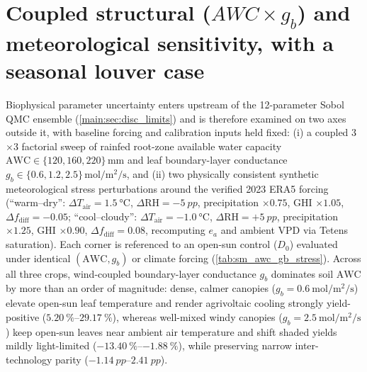 \documentclass[preprint,12pt,a4paper]{elsarticle}
\begin{document}
\section{Coupled structural ($AWC\times g_b$) and meteorological sensitivity, with a seasonal louver case}
\label{sec:sm_structural_louver}

Biophysical parameter uncertainty enters upstream of the \num{12}-parameter Sobol QMC ensemble (\cref{main:sec:disc_limits}) and is therefore examined on two axes outside it, with baseline forcing and calibration inputs held fixed: (i) a coupled \num{3}$\times$\num{3} factorial sweep of rainfed root-zone available water capacity $\mathrm{AWC}\in\{\num{120}, \num{160}, \num{220}\}\,\unit{\milli\meter}$ and leaf boundary-layer conductance $g_b\in\{\num{0.6}, \num{1.2}, \num{2.5}\}\,\unit{\mole\per\square\meter\per\second}$, and (ii) two physically consistent synthetic meteorological stress perturbations around the verified 2023 ERA5 forcing (``warm--dry'': $\Delta T_{\mathrm{air}}=\qty{+1.5}{\celsius}$, $\Delta\mathrm{RH}=-\qty{5}{pp}$, precipitation $\times\num{0.75}$, GHI $\times\num{1.05}$, $\Delta f_{\mathrm{diff}}=\num{-0.05}$; ``cool--cloudy'': $\Delta T_{\mathrm{air}}=\qty{-1.0}{\celsius}$, $\Delta\mathrm{RH}=+\qty{5}{pp}$, precipitation $\times\num{1.25}$, GHI $\times\num{0.90}$, $\Delta f_{\mathrm{diff}}=\num{+0.08}$, recomputing $e_a$ and ambient VPD via Tetens saturation). Each corner is referenced to an open-sun control ($D_0$) evaluated under identical $(\mathrm{AWC}, g_b)$ or climate forcing (\cref{tab:sm_awc_gb_stress}). Across all three crops, wind-coupled boundary-layer conductance $g_b$ dominates soil $\mathrm{AWC}$ by more than an order of magnitude: dense, calmer canopies ($g_b=\qty{0.6}{\mole\per\square\meter\per\second}$) elevate open-sun leaf temperature and render agrivoltaic cooling strongly yield-positive ($\qtyrange{+5.20}{+29.17}{\percent}$), whereas well-mixed windy canopies ($g_b=\qty{2.5}{\mole\per\square\meter\per\second}$) keep open-sun leaves near ambient air temperature and shift shaded yields mildly light-limited ($\qtyrange{-13.40}{-1.88}{\percent}$), while preserving narrow inter-technology parity ($\qtyrange{-1.14}{+2.41}{pp}$).
\end{document}
